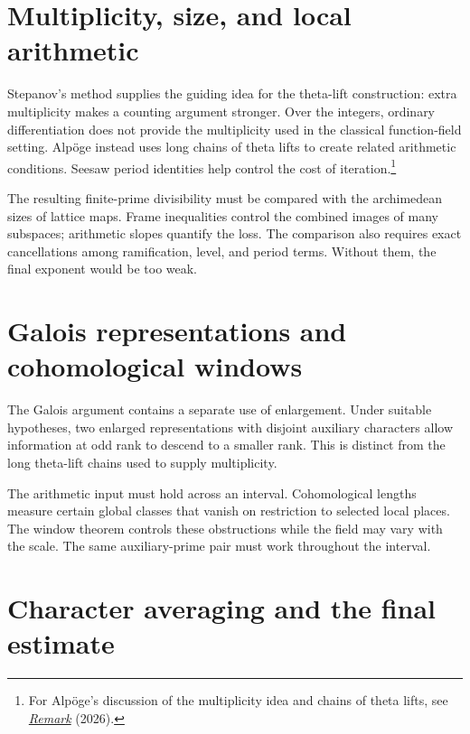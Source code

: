 \documentclass[11pt,openany,oneside]{scrbook}
\theoremstyle{definition}
\theoremstyle{remark}
\begin{document}
\null
\clearpage

\begingroup\linespread{1.035}\selectfont
\section*{Multiplicity, size, and local arithmetic}

Stepanov's method supplies the guiding idea for the theta-lift construction: extra multiplicity makes a counting argument stronger. Over the integers, ordinary differentiation does not provide the multiplicity used in the classical function-field setting. Alpöge instead uses long chains of theta lifts to create related arithmetic conditions. Seesaw period identities help control the cost of iteration.\footnote{For Alpöge's discussion of the multiplicity idea and chains of theta lifts, see \href{https://alpo.ge/remark.pdf}{\emph{Remark}} (2026).}

The resulting finite-prime divisibility must be compared with the archimedean sizes of lattice maps. Frame inequalities control the combined images of many subspaces; arithmetic slopes quantify the loss. The comparison also requires exact cancellations among ramification, level, and period terms. Without them, the final exponent would be too weak.

\section*{Galois representations and cohomological windows}

The Galois argument contains a separate use of enlargement. Under suitable hypotheses, two enlarged representations with disjoint auxiliary characters allow information at odd rank to descend to a smaller rank. This is distinct from the long theta-lift chains used to supply multiplicity.

The arithmetic input must hold across an interval. Cohomological lengths measure certain global classes that vanish on restriction to selected local places. The window theorem controls these obstructions while the field may vary with the scale. The same auxiliary-prime pair must work throughout the interval.

\section*{Character averaging and the final estimate}
\end{document}
